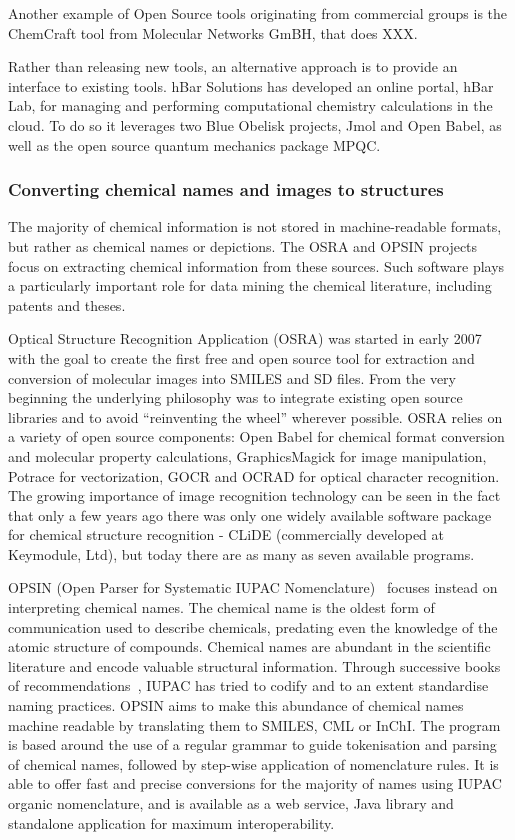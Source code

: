 \documentclass[10pt]{bmc_article}
\newenvironment{bmcformat}{\fussy\setboolean{publ}{true}}{\fussy}
\begin{document}
\begin{bmcformat}
Another example of Open Source
tools originating from commercial groups is the ChemCraft tool from
Molecular Networks GmBH, that does XXX.

Rather than releasing new tools, an alternative approach is to provide an
interface to existing tools. hBar Solutions has developed an online
portal, hBar Lab, for managing and performing computational chemistry
calculations in the cloud. To do so it leverages two Blue Obelisk
projects, Jmol and Open Babel, as well as the open source quantum
mechanics package MPQC.

\subsubsection*{Converting chemical names and images to structures}

The majority of chemical information is not stored in machine-readable
formats, but rather as chemical names or depictions. The OSRA and OPSIN
projects focus on extracting chemical information from these sources.
Such software plays a particularly important role for data mining the
chemical literature, including patents and theses.

Optical Structure Recognition Application (OSRA) \cite{WebOSRA} was started
in early 2007 with the goal to create the first free and open source
tool for extraction and conversion of molecular images into SMILES and
SD files. From the very beginning the underlying philosophy was to integrate
existing open source libraries and to avoid ``reinventing the wheel''
wherever possible. OSRA relies on a variety of open source components:
Open Babel for chemical format
conversion and molecular property calculations, GraphicsMagick for image
manipulation, Potrace for vectorization, GOCR and OCRAD for optical
character recognition. The growing importance of image
recognition technology can be seen in the fact that
only a few years ago there was only one widely available software
package for chemical structure recognition -  CLiDE (commercially
developed at Keymodule, Ltd), but today there are as many as seven
available programs.

OPSIN (Open Parser for Systematic IUPAC
Nomenclature)~\cite{lowe_chemical_2011} focuses instead on interpreting chemical names.
The chemical name is the oldest form of communication used to
describe chemicals, predating
even the knowledge of the atomic structure of compounds.
Chemical names are abundant in the scientific
literature and encode valuable structural information.
Through successive books of
recommendations~\cite{iupac_nomenclature_1979, iupac_guide_1993},
IUPAC has tried to codify and to an extent standardise naming practices.
OPSIN aims to make this abundance of
chemical names machine readable by translating them to SMILES, CML or
InChI. The program is based around the use of a regular grammar to
guide tokenisation and parsing of chemical names, followed by
step-wise application of nomenclature rules. It is able to offer
fast and precise conversions for the majority of names using IUPAC
organic nomenclature, and is available as a web service, Java
library and standalone application for maximum interoperability.


\end{bmcformat}
\end{document}
